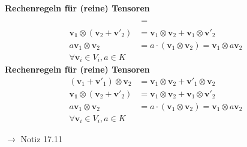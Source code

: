 \documentclass[11pt]{article}
\renewcommand{\cite}[1]{\par\bigskip\hfill{\color{gray}\tiny\(\to\) #1}}
\renewcommand{\vec}[1]{\mathbf{#1}}
\newenvironment{field}{}{\newpage}
\newif\ifnote
\newenvironment{note}{\notetrue}{\notefalse}
\newcommand{\localtag}{}
\newcommand{\globaltag}{}
\newcommand{\uuid}{}
\newcommand{\tags}[1]{
    \ifnote
        \renewcommand{\localtag}{#1}
    \else
        \renewcommand{\globaltag}{#1}
    \fi
    }
\newcommand{\xplain}[1]{\renewcommand{\uuid}{#1}}
\begin{document}
\begin{note}
    \tags{Satz}
    \xplain{56a72caf-26c5-4118-8a92-f2d9a49927ec}

    \begin{field}
        \textbf{Rechenregeln für (reine) Tensoren}
        \begin{align*}
            \phantom{(\vec{v}_1 + \vec{v}'_1) \otimes \vec{v}_2} &= \phantom{\vec{v}_1 \otimes \vec{v}_2 + \vec{v}'_1 \otimes \vec{v}_2}\\
            \vec{v_1} \otimes (\vec{v}_2 + \vec{v}'_2) &= \vec{v}_1 \otimes \vec{v}_2 + \vec{v}_1 \otimes \vec{v}'_2\\
            a\vec{v}_1 \otimes \vec{v}_2 &= a \cdot (\vec{v}_1\otimes \vec{v}_2) = \vec{v}_1 \otimes a\vec{v}_2\\
            \forall \vec{v}_i\in V_i, a\in K
        \end{align*}
    \end{field}
    \begin{field}
        \textbf{Rechenregeln für (reine) Tensoren}
        \begin{align*}
            (\vec{v}_1 + \vec{v}'_1) \otimes \vec{v}_2 &= \vec{v}_1 \otimes \vec{v}_2 + \vec{v}'_1 \otimes \vec{v}_2\\
            \vec{v_1} \otimes (\vec{v}_2 + \vec{v}'_2) &= \vec{v}_1 \otimes \vec{v}_2 + \vec{v}_1 \otimes \vec{v}'_2\\
            a\vec{v}_1 \otimes \vec{v}_2 &= a \cdot (\vec{v}_1\otimes \vec{v}_2) = \vec{v}_1 \otimes a\vec{v}_2\\
            \forall \vec{v}_i\in V_i, a\in K
        \end{align*}
        \cite{Notiz 17.11}
    \end{field}


\end{note}
\end{document}

